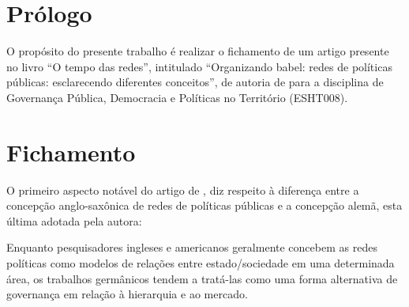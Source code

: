 \documentclass[
article,			%
11pt,				%
oneside,			%
a4paper,			%
english,			%
brazil,				%
sumario=tradicional
]{abntex2}
\begin{document}
	
	
	\frenchspacing 
	
	
	\maketitle
	

	\textual
	
	
	\section*{Prólogo}
	
	O propósito do presente trabalho é realizar o fichamento de um artigo presente no livro ``O tempo das redes'', intitulado ``Organizando babel: redes de políticas públicas: esclarecendo diferentes conceitos'', de autoria de  para a disciplina de Governança Pública, Democracia e Políticas no Território (ESHT008).
	
	\section{Fichamento}
	
	O primeiro aspecto notável do artigo de , diz respeito à diferença entre a concepção anglo-saxônica de redes de políticas públicas e a concepção alemã, esta última adotada pela autora:
	
	\begin{citacao}Enquanto pesquisadores ingleses e americanos geralmente concebem as redes políticas como modelos de relações entre estado/sociedade em uma determinada área, os trabalhos germânicos tendem a tratá-las como uma forma alternativa de governança em relação à hierarquia e ao mercado. \cite[p. 218]{borzel2008a}
	\end{citacao}
\end{document}

